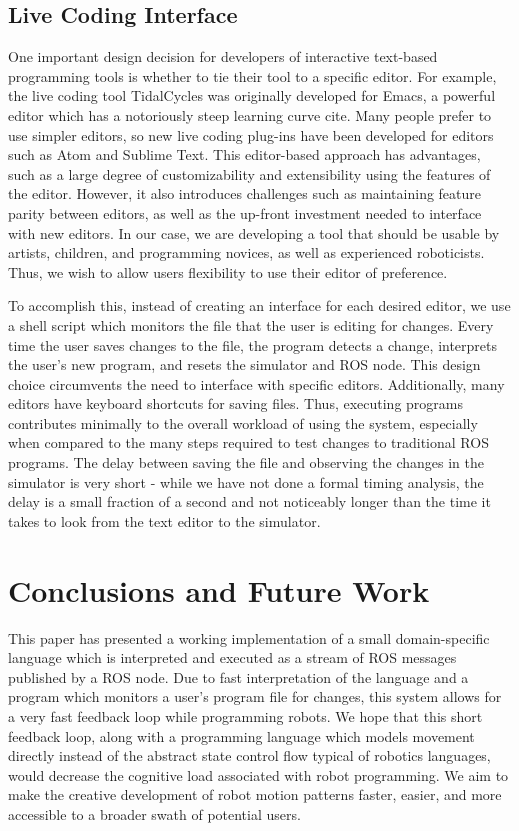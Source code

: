 \documentclass[sigconf]{acmart}
\begin{document}
\subsection{Live Coding Interface}\label{live-coding-interface}

One important design decision for developers of interactive text-based
programming tools is whether to tie their tool to a specific editor. For
example, the live coding tool TidalCycles was originally
developed for Emacs, a powerful editor which has a notoriously steep
learning curve {\color{red} cite}. Many people prefer to use simpler editors, so new
live coding plug-ins have been developed for editors such as Atom and
Sublime Text. This editor-based approach has advantages, such as a large
degree of customizability and extensibility using the features of the
editor. However, it also introduces challenges such as maintaining
feature parity between editors, as well as the up-front investment
needed to interface with new editors. In our case, we are developing a
tool that should be usable by artists, children, and programming
novices, as well as experienced roboticists. Thus, we wish to allow
users flexibility to use their editor of preference.

To accomplish this, instead of creating an interface for each desired
editor, we use a shell script which monitors the file that the user is
editing for changes. Every time the user saves changes to the file, the
program detects a change, interprets the user's new program, and resets
the simulator and ROS node. This design choice circumvents the need to
interface with specific editors. Additionally, many editors have
keyboard shortcuts for saving files. Thus, executing programs
contributes minimally to the overall workload of using the system,
especially when compared to the many steps required to test changes to
traditional ROS programs. The delay between saving the file and observing the
changes in the simulator is very short - while we have not done a formal timing
analysis, the delay is a small fraction of a second and not noticeably longer than the
time it takes to look from the text editor to the simulator.

\section{Conclusions and Future
Work}\label{conclusions-and-future-work}

This paper has presented a working implementation of a small domain-specific
language which is interpreted and executed as a stream of ROS messages published
by a ROS node. Due to fast interpretation of the language and a program which
monitors a user's program file for changes, this system allows for a very fast
feedback loop while programming robots. We hope that this short feedback loop,
along with a programming language which models movement directly instead of the
abstract state control flow typical of robotics languages, would decrease the
cognitive load associated with robot programming. We aim to make the creative
development of robot motion patterns faster, easier, and more accessible to a
broader swath of potential users.
\end{document}
